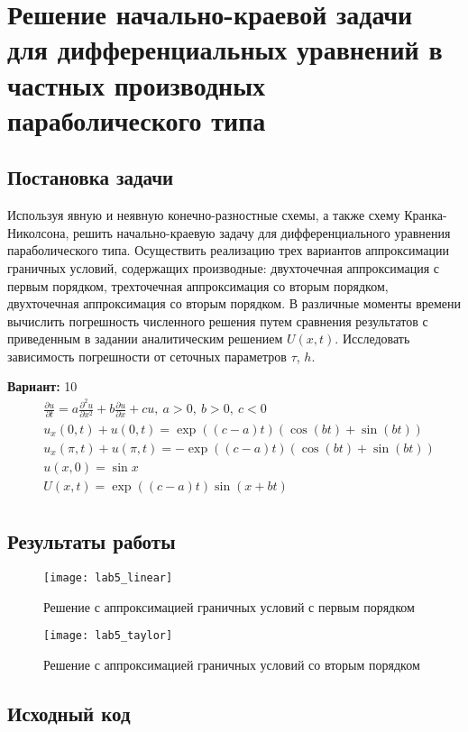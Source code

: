 \section{Решение начально-краевой задачи для дифференциальных уравнений в частных производных параболического типа}

\subsection{Постановка задачи}
Используя явную и неявную конечно-разностные схемы, а также схему Кранка-Николсона, решить начально-краевую задачу для дифференциального уравнения параболического типа. Осуществить реализацию трех вариантов аппроксимации граничных условий, содержащих производные: двухточечная аппроксимация с первым порядком, трехточечная аппроксимация со вторым порядком, двухточечная аппроксимация со вторым порядком. В различные моменты времени вычислить погрешность численного решения путем сравнения результатов с приведенным в задании аналитическим решением $U(x, t)$. Исследовать зависимость погрешности от сеточных параметров $\tau$, $h$.

{\bfseries Вариант:} 10
\begin{align*}
& \frac{\partial u}{\partial t} = a \frac{\partial^2 u}{\partial x^2} + b \frac{\partial u}{\partial x} + c u,\ a > 0,\ b > 0,\ c < 0 \\
& u_x(0, t) + u(0, t) = \exp((c - a) t)(\cos(bt) + \sin(bt)) \\
& u_x(\pi, t) + u(\pi, t) = -\exp((c - a) t)(\cos(bt) + \sin(bt)) \\
& u(x, 0) = \sin x \\
& U(x, t) = \exp((c - a) t) \sin(x + bt) \\
\end{align*}
\pagebreak

\subsection{Результаты работы}
\begin{figure}[h!]
\centering
\texttt{[image: lab5\_linear]}
\caption{Решение с аппроксимацией граничных условий с первым порядком}
\end{figure}

\vfill

\begin{figure}[h!]
\centering
\texttt{[image: lab5\_taylor]}
\caption{Решение с аппроксимацией граничных условий со вторым порядком}
\end{figure}
\pagebreak

\subsection{Исходный код}

\pagebreak

\pagebreak
